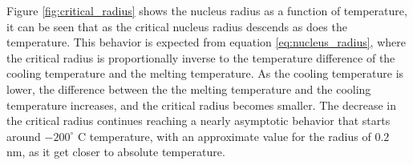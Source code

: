 Figure \ref{fig:critical_radius} shows the nucleus radius as a function of temperature, it can be seen that as the critical nucleus radius descends as does the temperature. This behavior is expected from equation \ref{eq:nucleus_radius}, where the critical radius is proportionally inverse to the temperature difference of the cooling temperature and the melting temperature. As the cooling temperature is lower, the difference between the the melting temperature and the cooling temperature increases, and the critical radius becomes smaller.
The decrease in the critical radius continues reaching a nearly asymptotic behavior that starts around $-200^{\circ}$ C  temperature, with an approximate value for the radius of $0.2$ nm, as it get closer to absolute temperature. 

